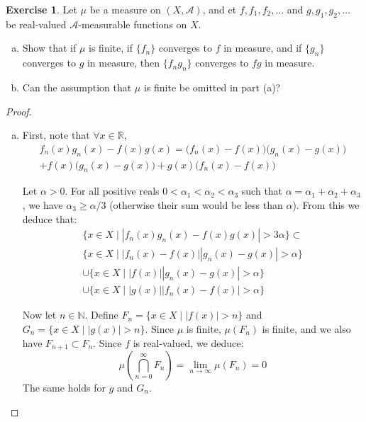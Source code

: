 \documentclass[11pt,a4paper,twoside]{article}
\theoremstyle{definition}
\newcounter{excounter}
\newtheorem{exercise}[excounter]{Exercise}
\begin{document}
\begin{exercise}
  Let $\mu$ be a measure on $(X, \mathscr{A})$, and et $f, f_1, f_2, \dotsc$ and $g, g_1, g_2, \dotsc$ be real-valued
  $\mathscr{A}$-measurable functions on $X$.
  \begin{enumerate}[(a)]
  \item Show that if $\mu$ is finite, if $\{ f_n \}$ converges to $f$ in measure, and if $\{ g_n \}$ converges to $g$ in measure,
    then $\{ f_n g_n \}$ converges to $fg$ in measure.
  \item Can the assumption that $\mu$ is finite be omitted in part (a)?
  \end{enumerate}
\end{exercise}

\begin{proof}\hfill

  \begin{enumerate}[(a)]

  \item First, note that $\forall x \in \mathbb{R}$,
  \begin{multline*}
    f_n (x) g_n (x) - f (x) g (x) = \big( f_n (x) - f (x) \big) \big( g_n (x) - g (x) \big) \\
    + f (x) \big( g_n (x) - g (x) \big) + g (x) \big( f_n (x) - f (x) \big)
  \end{multline*}

  Let $\alpha > 0$. For all positive reals $0 < \alpha_1 < \alpha_2 < \alpha_3$ such that $\alpha = \alpha_1 + \alpha_2 + \alpha_3$,
  we have $\alpha_3 \geq \alpha / 3$ (otherwise their sum would be less than $\alpha$). From this we deduce that:
  \begin{multline}\label{eq:inclusion}
      \big\{ x \in X \mid | f_n (x) g_n (x) - f (x) g (x) | > 3 \alpha \big\} \subset \\
      \big\{ x \in X \mid | f_n (x) - f (x) | | g_n (x) - g (x) | > \alpha \big\} \\
      \cup \big\{ x \in X \mid | f (x) | | g_n (x) - g (x) | > \alpha \big\} \\
      \cup \big\{ x \in X \mid | g (x) | | f_n (x) - f (x) | > \alpha \big\}
  \end{multline}

  Now let $n \in \mathbb{N}$. Define $F_n = \{ x \in X \mid | f (x) | > n \}$ and $G_n = \{ x \in X \mid | g (x) | > n \}$.
  Since $\mu$ is finite, $\mu ( F_n )$ is finite, and we also have
  $F_{n + 1} \subset F_n$. Since $f$ is real-valued, we deduce:
  \begin{equation*}
    \mu \left( \bigcap_{n = 0}^\infty F_n \right) = \lim_{n \to \infty} \mu (F_n) = 0
  \end{equation*}
  The same holds for $g$ and $G_n$.


\end{enumerate}
\end{proof}
\end{document}
